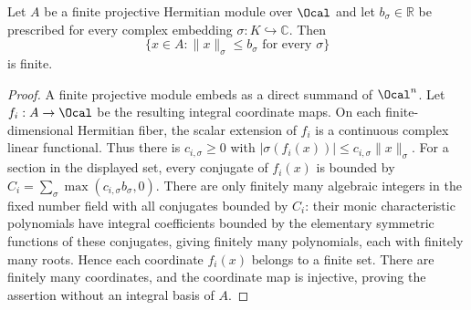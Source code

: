 \begin{lemma}
\label{lem:bounded-integral-sections}
\leanok
Let $A$ be a finite projective Hermitian module over $\Ocal$ and let
$b_\sigma\in\mathbb R$ be prescribed for every complex embedding
$\sigma:K\hookrightarrow\mathbb C$. Then
\[
 \{x\in A:\|x\|_\sigma\leq b_\sigma\text{ for every }\sigma\}
\]
is finite.
\end{lemma}
\begin{proof}
A finite projective module embeds as a direct summand of $\Ocal^n$.
Let $f_i:A\to\Ocal$ be the resulting integral coordinate maps.
On each finite-dimensional Hermitian fiber, the scalar extension of $f_i$
is a continuous complex linear functional. Thus there is $c_{i,\sigma}\geq0$
with $|\sigma(f_i(x))|\leq c_{i,\sigma}\|x\|_\sigma$.
For a section in the displayed set, every conjugate of $f_i(x)$ is
bounded by $C_i=\sum_\sigma\max(c_{i,\sigma}b_\sigma,0)$.
There are only finitely many algebraic integers in the fixed number field
with all conjugates bounded by $C_i$: their monic characteristic
polynomials have integral coefficients bounded by the elementary
symmetric functions of these conjugates, giving finitely many polynomials,
each with finitely many roots. Hence each coordinate $f_i(x)$ belongs to
a finite set. There are finitely many coordinates, and the coordinate map
is injective, proving the assertion without an integral basis of $A$.
\end{proof}

